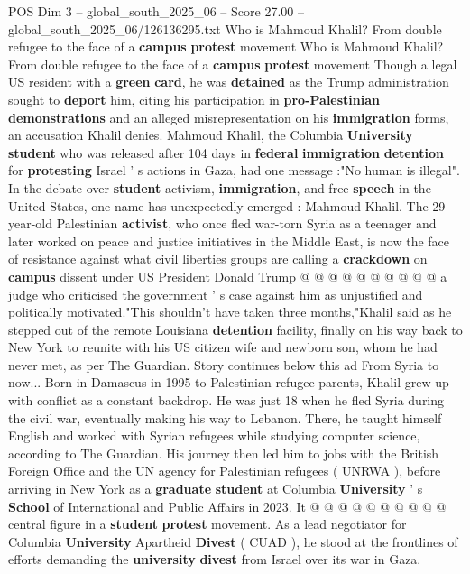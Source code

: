 \begin{textsample}{POS Dim 3 – global\_south\_2025\_06 – Score 27.00 – global\_south\_2025\_06/126136295.txt}  \label{ex:f3_pos_188}
Who is Mahmoud Khalil?
From double refugee to the face of a \textbf{campus} \textbf{protest} movement Who is Mahmoud Khalil?
From double refugee to the face of a \textbf{campus} \textbf{protest} movement Though a legal US resident with a \textbf{green} \textbf{card}, he was \textbf{detained} as the Trump administration sought to \textbf{deport} him, citing his participation in \textbf{pro-Palestinian} \textbf{demonstrations} and an alleged misrepresentation on his \textbf{immigration} forms, an accusation Khalil denies.
Mahmoud Khalil, the Columbia \textbf{University} \textbf{student} who was released after 104 days in \textbf{federal} \textbf{immigration} \textbf{detention} for \textbf{protesting} Israel ' s actions in Gaza, had one message :"No human is illegal".
In the debate over \textbf{student} activism, \textbf{immigration}, and free \textbf{speech} in the United States, one name has unexpectedly emerged : Mahmoud Khalil.
The 29-year-old Palestinian \textbf{activist}, who once fled war-torn Syria as a teenager and later worked on peace and justice initiatives in the Middle East, is now the face of resistance against what civil liberties groups are calling a \textbf{crackdown} on \textbf{campus} dissent under US President Donald Trump @ @ @ @ @ @ @ @ @ @ a judge who criticised the government ' s case against him as unjustified and politically motivated."This shouldn't have taken three months,"Khalil said as he stepped out of the remote Louisiana \textbf{detention} facility, finally on his way back to New York to reunite with his US citizen wife and newborn son, whom he had never met, as per The Guardian.
Story continues below this ad From Syria to now...
Born in Damascus in 1995 to Palestinian refugee parents, Khalil grew up with conflict as a constant backdrop.
He was just 18 when he fled Syria during the civil war, eventually making his way to Lebanon.
There, he taught himself English and worked with Syrian refugees while studying computer science, according to The Guardian.
His journey then led him to jobs with the British Foreign Office and the UN agency for Palestinian refugees ( UNRWA ), before arriving in New York as a \textbf{graduate} \textbf{student} at Columbia \textbf{University} ' s \textbf{School} of International and Public Affairs in 2023.
It @ @ @ @ @ @ @ @ @ @ central figure in a \textbf{student} \textbf{protest} movement.
As a lead negotiator for Columbia \textbf{University} Apartheid \textbf{Divest} ( CUAD ), he stood at the frontlines of efforts demanding the \textbf{university} \textbf{divest} from Israel over its war in Gaza.

\end{textsample}
